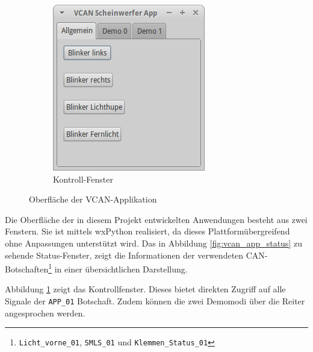 \documentclass[
  a4paper,					    %
  twoside,
  DIV=calc,     				%
  bibliography=totoc,
  cleardoublepage=empty,
  ngerman,     					%
  final       					%
]{scrbook}
\begin{document}
\begin{figure}
\begin{subfigure}[b]{0.39\textwidth}
        \includegraphics[width=\textwidth]{vcan_app_control}
        \caption{Kontroll-Fenster}
        \label{fig:vcan_app_control}
    \end{subfigure}
    \caption{Oberfläche der VCAN-Applikation}
    \label{fig:vcan_app}
\end{figure}

Die Oberfläche der in diesem Projekt entwickelten Anwendungen besteht aus zwei Fenstern. Sie ist mittels wxPython realisiert, da dieses Plattformübergreifend ohne Anpassungen unterstützt wird. Das in Abbildung \ref{fig:vcan_app_status} zu sehende Status-Fenster, zeigt die Informationen der verwendeten CAN-Botschaften\footnote{\texttt{Licht\_vorne\_01}, \texttt{SMLS\_01} und \texttt{Klemmen\_Status\_01}} in einer übersichtlichen Darstellung.

Abbildung \ref{fig:vcan_app_control} zeigt das Kontrollfenster. Dieses bietet direkten Zugriff auf alle Signale der \texttt{APP\_01} Botschaft. Zudem können die zwei Demomodi über die Reiter angesprochen werden.
\end{document}
